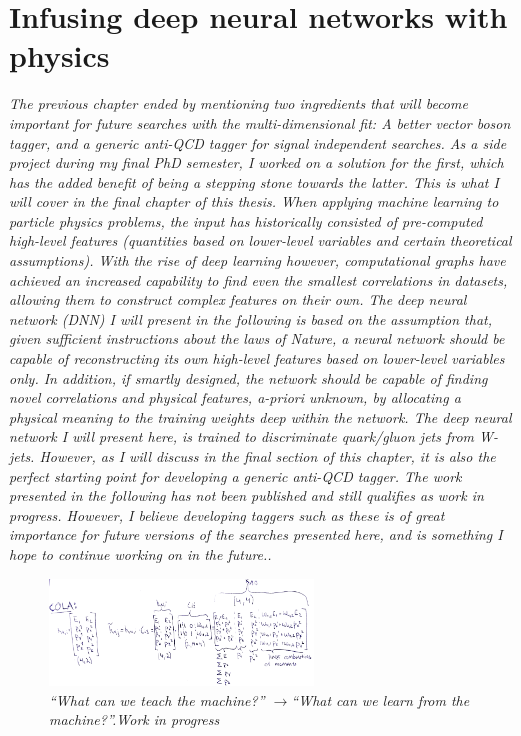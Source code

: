 \vspace*{\fill}
\section*{Infusing deep neural networks with physics}
\label{sec:lolaintro}
\begin{centering}
\textit{
The previous chapter ended by mentioning two ingredients that will become important for future searches with the multi-dimensional fit: A better vector boson tagger, and a generic anti-QCD tagger for signal independent searches. As a side project during my final PhD semester, I worked on a solution for the first, which has the added benefit of being a stepping stone towards the latter. This is what I will cover in the final chapter of this thesis.
\newline
\newline
When applying machine learning to particle physics problems, the input has historically consisted of pre-computed high-level features (quantities based on lower-level variables and certain theoretical assumptions).
With the rise of deep learning however, computational graphs have achieved an increased capability to find even the smallest correlations in datasets, allowing them to construct complex features on their own. The deep neural network (DNN) I will present in the following is based on the assumption that, given sufficient instructions about the laws of Nature, a neural network should be capable of reconstructing its own high-level features based on lower-level variables only. In addition, if smartly designed, the network should be capable of finding novel correlations and physical features, a-priori unknown, by allocating a physical meaning to the training weights deep within the network. The deep neural network I will present here, is trained to discriminate quark/gluon jets from W-jets. However, as I will discuss in the final section of this chapter, it is also the perfect starting point for developing a generic anti-QCD tagger.
\newline
\newline
The work presented in the following has not been published and still qualifies as work in progress. However, I believe developing taggers such as these is of great importance for future versions of the searches presented here, and is something I hope to continue working on in the future..
}
\begin{figure}[b!] 
    \centering
    \includegraphics[width=7cm]{figures/vtagging/misc/cola.png}
    \vspace*{5mm}
    \caption*{\footnotesize{\textit{ ``What can we teach the machine?'' $\rightarrow$``What can we learn from the machine?''.\newline Work in progress}}}
\end{figure}
\end{centering}
\clearpage
